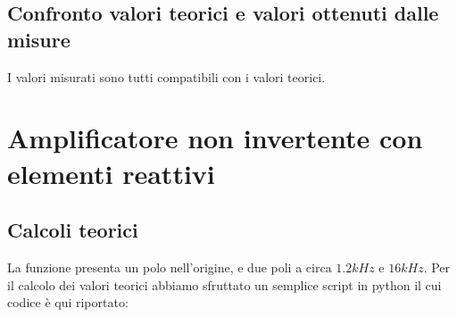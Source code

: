 \documentclass{article}
\begin{document}
\subsection{Confronto valori teorici e valori ottenuti dalle misure}
\normalsize I valori misurati sono tutti compatibili con i valori teorici.

\section{Amplificatore non invertente con elementi reattivi}
\subsection{Calcoli teorici}
La funzione presenta un polo nell'origine, e due poli a circa $1.2kHz$ e $16kHz$.
Per il calcolo dei valori teorici abbiamo sfruttato un semplice script in python il cui codice è qui riportato:
\end{document}
